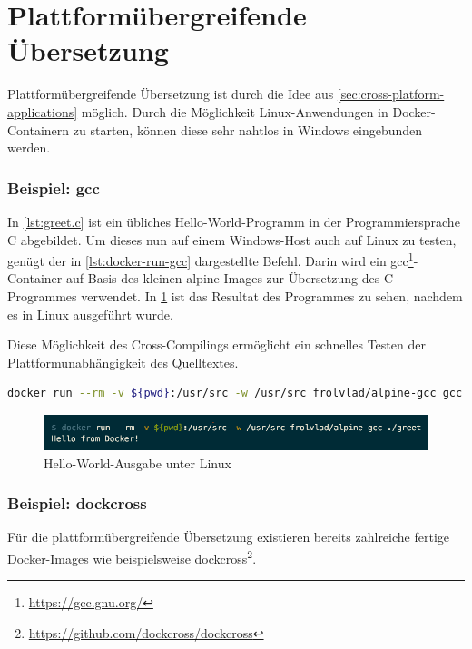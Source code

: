 \section{Plattformübergreifende Übersetzung}
\label{sec:plattformuebergreifende-uebersetzung}
Plattformübergreifende Übersetzung ist durch die Idee aus \cref{sec:cross-platform-applications} möglich.
Durch die Möglichkeit Linux-Anwendungen in Docker-Containern zu starten, können diese sehr nahtlos in Windows eingebunden werden.

\subsubsection{Beispiel: gcc}
In \cref{lst:greet.c} ist ein übliches Hello-World-Programm in der Programmiersprache C abgebildet.
Um dieses nun auf einem Windows-Host auch auf Linux zu testen, genügt der in \cref{lst:docker-run-gcc} dargestellte Befehl.
Darin wird ein gcc\footnote{\url{https://gcc.gnu.org/}}-Container auf Basis des kleinen alpine-Images zur Übersetzung des C-Programmes verwendet.
In \cref{fig:greet-output} ist das Resultat des Programmes zu sehen, nachdem es in Linux ausgeführt wurde.

Diese Möglichkeit des Cross-Compilings ermöglicht ein schnelles Testen der Plattformunabhängigkeit des Quelltextes.



\begin{lstlisting}[caption=Docker-Kommando zum Übersetzen eines C-Programmes mit gcc, language=bash, label=lst:docker-run-gcc]
docker run --rm -v ${pwd}:/usr/src -w /usr/src frolvlad/alpine-gcc gcc -o greet greet.c
\end{lstlisting}

\begin{figure}[htbp]
    \centering
    \includegraphics[width=0.8\linewidth,clip]{images/greet-output}
    \caption{Hello-World-Ausgabe unter Linux}
\label{fig:greet-output}
\end{figure}

\subsubsection{Beispiel: dockcross}
Für die plattformübergreifende Übersetzung existieren bereits zahlreiche fertige Docker-Images wie beispielsweise dockcross\footnote{\url{https://github.com/dockcross/dockcross}}.

